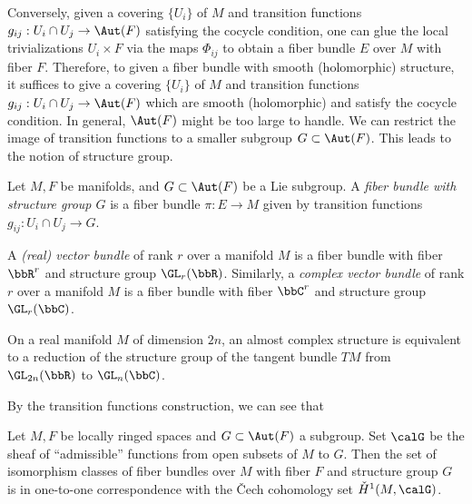 Conversely, given a covering \(\{U_i\}\) of \(M\) and transition functions \(g_{ij}: U_i \cap U_j \to \Aut(F)\) satisfying the cocycle condition,
one can glue the local trivializations \(U_i \times F\) via the maps \(\Phi_{ij}\) to obtain a fiber bundle \(E\) over \(M\) with fiber \(F\).
Therefore, to given a fiber bundle with smooth (holomorphic) structure, it suffices to give a covering \(\{U_i\}\) of \(M\) and transition functions \(g_{ij}: U_i \cap U_j \to \Aut(F)\) which are smooth (holomorphic) and satisfy the cocycle condition.
In general, \(\Aut(F)\) might be too large to handle.
We can restrict the image of transition functions to a smaller subgroup \(G \subset \Aut(F)\).
This leads to the notion of structure group.

\begin{definition}\label{def:structure_group_of_vector_bundles}
	Let \(M,F\) be manifolds, and \(G \subset \Aut(F)\) be a Lie subgroup.
	A \emph{fiber bundle with structure group \(G\)} is a fiber bundle \(\pi: E \to M\) given by transition functions \(g_{ij}: U_i \cap U_j \to G\).
\end{definition}

\begin{example}\label{eg:vector_bundle_as_fiber_bundle}
	A \emph{(real) vector bundle} of rank \(r\) over a manifold \(M\) is a fiber bundle with fiber \(\bbR^r\) and structure group \(\GL_r(\bbR)\).
	Similarly, a \emph{complex vector bundle} of rank \(r\) over a manifold \(M\) is a fiber bundle with fiber \(\bbC^r\) and structure group \(\GL_r(\bbC)\).

	On a real manifold \(M\) of dimension \(2n\), an almost complex structure is equivalent to a reduction of the structure group of the tangent bundle \(TM\) from \(\GL_{2n}(\bbR)\) to \(\GL_n(\bbC)\).
\end{example}

By the transition functions construction, we can see that
\begin{theorem}\label{thm:classification_fiber_bundle_by_sheaves_cohomology}
	Let \(M,F\) be locally ringed spaces and \(G \subset \Aut(F)\) a subgroup.
	Set \(\calG\) be the sheaf of ``admissible'' functions from open subsets of \(M\) to \(G\).
	Then the set of isomorphism classes of fiber bundles over \(M\) with fiber \(F\) and structure group \(G\) is in one-to-one correspondence with the \v{C}ech cohomology set \(\check{H}^1(M,\calG)\).
\end{theorem}

